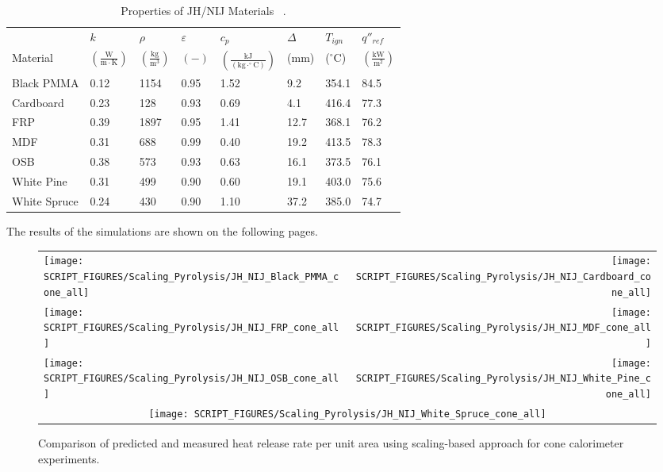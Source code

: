 \begin{table}[!h]
\caption[Properties of JH/NIJ Materials]{Properties of JH/NIJ Materials ~\cite{Lattimer:NIJ19}.}
\centering
\begin{tabular}{|p{5.5cm}|p{1.0cm}|p{1.0cm}|p{0.8cm}|p{1.4cm}|p{1.0cm}|p{1.0cm}|p{1.2cm}|}
\hline
                                               & $k$    & $\rho$      & $\varepsilon$   & $c_{p}$ & $\Delta$    & $T_{ign}$ & $q''_{ref}$ \\
Material                                       & $\mathrm{\left(\frac{W}{m\cdot K}\right)}$ & $\mathrm{\left(\frac{kg}{m^{3}}\right)}$ & $\mathrm{( - )}$ & $\mathrm{\left(\frac{kJ}{(kg\cdot ^{\circ}C)}\right)}$ &  ($\mathrm{mm}$)   & ($\mathrm{^{\circ}C}$) & $\mathrm{\left(\frac{kW}{m^{2}}\right)}$ \\ \hline
\hline
Black PMMA & 0.12 & 1154 & 0.95 & 1.52 & 9.2 & 354.1 & 84.5 \\ \hline
Cardboard & 0.23 & 128 & 0.93 & 0.69 & 4.1 & 416.4 & 77.3 \\ \hline
FRP & 0.39 & 1897 & 0.95 & 1.41 & 12.7 & 368.1 & 76.2 \\ \hline
MDF & 0.31 & 688 & 0.99 & 0.40 & 19.2 & 413.5 & 78.3 \\ \hline
OSB & 0.38 & 573 & 0.93 & 0.63 & 16.1 & 373.5 & 76.1 \\ \hline
White Pine & 0.31 & 499 & 0.90 & 0.60 & 19.1 & 403.0 & 75.6 \\ \hline
White Spruce & 0.24 & 430 & 0.90 & 1.10 & 37.2 & 385.0 & 74.7 \\ \hline
\end{tabular}
\label{Properties_JH_NIJ_Materials}
\end{table}

The results of the simulations are shown on the following pages.

\begin{figure}[p]
\begin{tabular*}{\textwidth}{l@{\extracolsep{\fill}}r}
\texttt{[image: SCRIPT\_FIGURES/Scaling\_Pyrolysis/JH\_NIJ\_Black\_PMMA\_cone\_all]} &
\texttt{[image: SCRIPT\_FIGURES/Scaling\_Pyrolysis/JH\_NIJ\_Cardboard\_cone\_all]} \\
\texttt{[image: SCRIPT\_FIGURES/Scaling\_Pyrolysis/JH\_NIJ\_FRP\_cone\_all]} &
\texttt{[image: SCRIPT\_FIGURES/Scaling\_Pyrolysis/JH\_NIJ\_MDF\_cone\_all]} \\
\texttt{[image: SCRIPT\_FIGURES/Scaling\_Pyrolysis/JH\_NIJ\_OSB\_cone\_all]} &
\texttt{[image: SCRIPT\_FIGURES/Scaling\_Pyrolysis/JH\_NIJ\_White\_Pine\_cone\_all]} \\
 \multicolumn{2}{c}{\texttt{[image: SCRIPT\_FIGURES/Scaling\_Pyrolysis/JH\_NIJ\_White\_Spruce\_cone\_all]}}
\end{tabular*}
\caption[HRRPUA of JH/NIJ materials using scaling model]
{Comparison of predicted and measured heat release rate per unit area using scaling-based approach for cone calorimeter experiments.}
\label{JH_NIJ_HRR_materials}
\end{figure}

